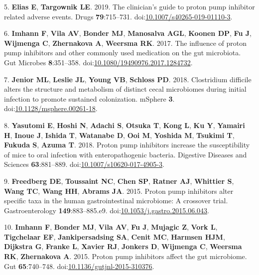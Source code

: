 \documentclass[11pt,]{article}
\begin{document}
\hypertarget{ref-Elias2019}{}
5. \textbf{Elias E}, \textbf{Targownik LE}. 2019. The clinician's guide
to proton pump inhibitor related adverse events. Drugs
\textbf{79}:715--731.
doi:\href{https://doi.org/10.1007/s40265-019-01110-3}{10.1007/s40265-019-01110-3}.

\hypertarget{ref-Imhann2017}{}
6. \textbf{Imhann F}, \textbf{Vila AV}, \textbf{Bonder MJ},
\textbf{Manosalva AGL}, \textbf{Koonen DP}, \textbf{Fu J},
\textbf{Wijmenga C}, \textbf{Zhernakova A}, \textbf{Weersma RK}. 2017.
The influence of proton pump inhibitors and other commonly used
medication on the gut microbiota. Gut Microbes \textbf{8}:351--358.
doi:\href{https://doi.org/10.1080/19490976.2017.1284732}{10.1080/19490976.2017.1284732}.

\hypertarget{ref-Jenior2018}{}
7. \textbf{Jenior ML}, \textbf{Leslie JL}, \textbf{Young VB},
\textbf{Schloss PD}. 2018. Clostridium difficile alters the structure
and metabolism of distinct cecal microbiomes during initial infection to
promote sustained colonization. mSphere \textbf{3}.
doi:\href{https://doi.org/10.1128/msphere.00261-18}{10.1128/msphere.00261-18}.

\hypertarget{ref-Yasutomi2018}{}
8. \textbf{Yasutomi E}, \textbf{Hoshi N}, \textbf{Adachi S},
\textbf{Otsuka T}, \textbf{Kong L}, \textbf{Ku Y}, \textbf{Yamairi H},
\textbf{Inoue J}, \textbf{Ishida T}, \textbf{Watanabe D}, \textbf{Ooi
M}, \textbf{Yoshida M}, \textbf{Tsukimi T}, \textbf{Fukuda S},
\textbf{Azuma T}. 2018. Proton pump inhibitors increase the
susceptibility of mice to oral infection with enteropathogenic bacteria.
Digestive Diseases and Sciences \textbf{63}:881--889.
doi:\href{https://doi.org/10.1007/s10620-017-4905-3}{10.1007/s10620-017-4905-3}.

\hypertarget{ref-Freedberg2015}{}
9. \textbf{Freedberg DE}, \textbf{Toussaint NC}, \textbf{Chen SP},
\textbf{Ratner AJ}, \textbf{Whittier S}, \textbf{Wang TC}, \textbf{Wang
HH}, \textbf{Abrams JA}. 2015. Proton pump inhibitors alter specific
taxa in the human gastrointestinal microbiome: A crossover trial.
Gastroenterology \textbf{149}:883--885.e9.
doi:\href{https://doi.org/10.1053/j.gastro.2015.06.043}{10.1053/j.gastro.2015.06.043}.

\hypertarget{ref-Imhann2015}{}
10. \textbf{Imhann F}, \textbf{Bonder MJ}, \textbf{Vila AV}, \textbf{Fu
J}, \textbf{Mujagic Z}, \textbf{Vork L}, \textbf{Tigchelaar EF},
\textbf{Jankipersadsing SA}, \textbf{Cenit MC}, \textbf{Harmsen HJM},
\textbf{Dijkstra G}, \textbf{Franke L}, \textbf{Xavier RJ},
\textbf{Jonkers D}, \textbf{Wijmenga C}, \textbf{Weersma RK},
\textbf{Zhernakova A}. 2015. Proton pump inhibitors affect the gut
microbiome. Gut \textbf{65}:740--748.
doi:\href{https://doi.org/10.1136/gutjnl-2015-310376}{10.1136/gutjnl-2015-310376}.
\end{document}
